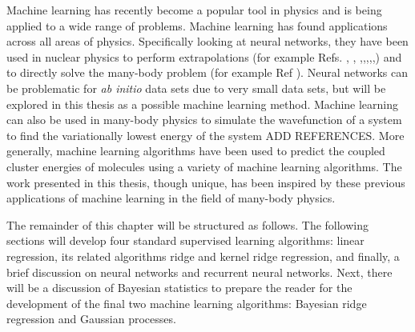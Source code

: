 Machine learning has recently become a popular tool in physics and is being applied to a wide range of problems. Machine learning has found applications across all areas of physics. Specifically looking at neural networks, they have been used in nuclear physics to perform extrapolations (for example Refs. \cite{Ref24}, \cite{Ref25}, \cite{Ref26},\cite{Ref27},\cite{Ref28},\cite{Ref29},\cite{Ref30},\cite{Ref31}) and to directly solve the many-body problem (for example Ref \cite{Ref32}).  Neural networks can be problematic for \textit{ab initio} data sets due to very small data sets, but will be explored in this thesis as a possible machine learning method.  Machine learning can also be used in many-body physics to simulate the wavefunction of a system to find the variationally lowest energy of the system {ADD REFERENCES}.  More generally, machine learning algorithms have been used to predict the coupled cluster energies of molecules using a variety of machine learning algorithms.  The work presented in this thesis, though unique, has been inspired by these previous applications of machine learning in the field of many-body physics. 

The remainder of this chapter will be structured as follows. The following sections will develop four standard supervised learning algorithms: linear regression, its related algorithms ridge and kernel ridge regression, and finally, a brief discussion on neural networks and recurrent neural networks. Next, there will be a discussion of Bayesian statistics to prepare the reader for the development of the final two machine learning algorithms: Bayesian ridge regression and Gaussian processes.